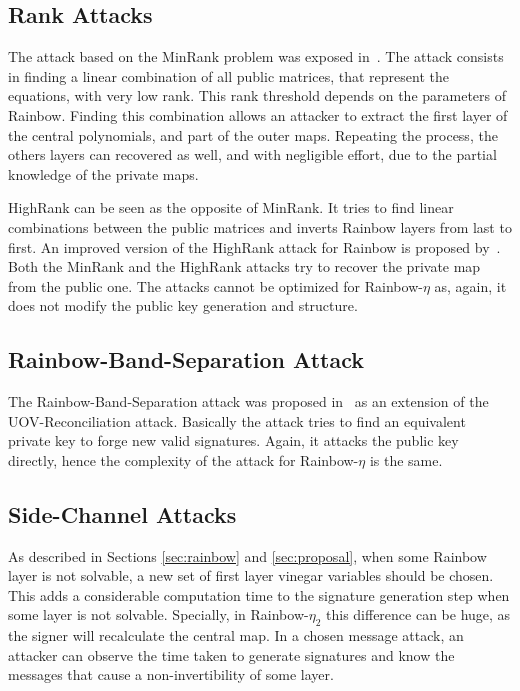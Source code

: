 \documentclass{ufsctex/ufsctex}
\begin{document}
\subsection{Rank Attacks}

The attack based on the MinRank problem was exposed
in~\cite{billet2006cryptanalysis}. The attack consists in finding a linear
combination of all public matrices, that represent the equations, with very low
rank. This rank threshold depends on the parameters of Rainbow. Finding this
combination allows an attacker to extract the first layer of the central
polynomials, and part of the outer maps. Repeating the process, the others
layers can recovered as well, and with negligible effort, due to the partial
knowledge of the private maps.

HighRank can be seen as the opposite of MinRank. It tries to find linear
combinations between the public matrices and inverts Rainbow layers from last
to first. An improved version of the HighRank attack for Rainbow is proposed
by~\cite{ding2008new}. Both the MinRank and the HighRank attacks try to recover
the private map from the public one. The attacks cannot be optimized for
Rainbow-$\eta$ as, again, it does not modify the public key generation and
structure.

\subsection{Rainbow-Band-Separation Attack}

The Rainbow-Band-Separation attack was proposed in~\cite{ding2008new} as an
extension of the UOV-Reconciliation attack. Basically the attack tries to find
an equivalent private key to forge new valid signatures. Again, it attacks the
public key directly, hence the complexity of the attack for Rainbow-$\eta$ is
the same.

\subsection{Side-Channel Attacks}

As described in Sections \ref{sec:rainbow} and \ref{sec:proposal}, when some
Rainbow layer is not solvable, a new set of first layer vinegar variables
should be chosen. This adds a considerable computation time to the signature
generation step when some layer is not solvable. Specially, in Rainbow-$\eta_2$
this difference can be huge, as the signer will recalculate the central map. In
a chosen message attack, an attacker can observe the time taken to generate
signatures and know the messages that cause a non-invertibility of some layer.
\end{document}
